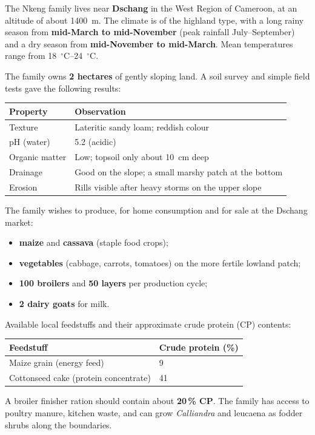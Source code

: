 \documentclass[11pt]{article}
\begin{document}
\begin{experience}
The Nkeng family lives near \textbf{Dschang} in the West Region of Cameroon, at an altitude of about \SI{1400}{m}. The climate is of the highland type, with a long rainy season from \textbf{mid-March to mid-November} (peak rainfall July--September) and a dry season from \textbf{mid-November to mid-March}. Mean temperatures range from \SIrange{18}{24}{\ensuremath{{}^{\circ}\mathrm{C}}}.

The family owns \textbf{2 hectares} of gently sloping land. A soil survey and simple field tests gave the following results:

\begin{center}
\begin{tabularx}{\linewidth}{|l|X|}
\hline
\rowcolor{popblueL} \textbf{Property} & \textbf{Observation} \\
\hline
Texture & Lateritic sandy loam; reddish colour \\
\hline
pH (water) & 5.2 (acidic) \\
\hline
Organic matter & Low; topsoil only about \SI{10}{cm} deep \\
\hline
Drainage & Good on the slope; a small marshy patch at the bottom \\
\hline
Erosion & Rills visible after heavy storms on the upper slope \\
\hline
\end{tabularx}
\end{center}

The family wishes to produce, for home consumption and for sale at the Dschang market:
\begin{itemize}
\item \textbf{maize} and \textbf{cassava} (staple food crops);
\item \textbf{vegetables} (cabbage, carrots, tomatoes) on the more fertile lowland patch;
\item \textbf{100 broilers} and \textbf{50 layers} per production cycle;
\item \textbf{2 dairy goats} for milk.
\end{itemize}

Available local feedstuffs and their approximate crude protein (CP) contents:
\begin{center}
\begin{tabularx}{\linewidth}{|l|X|}
\hline
\rowcolor{popblueL} \textbf{Feedstuff} & \textbf{Crude protein (\%)} \\
\hline
Maize grain (energy feed) & 9 \\
\hline
Cottonseed cake (protein concentrate) & 41 \\
\hline
\end{tabularx}
\end{center}

A broiler finisher ration should contain about \textbf{20\,\% CP}. The family has access to poultry manure, kitchen waste, and can grow \emph{Calliandra} and leucaena as fodder shrubs along the boundaries.
\end{experience}
\end{document}
